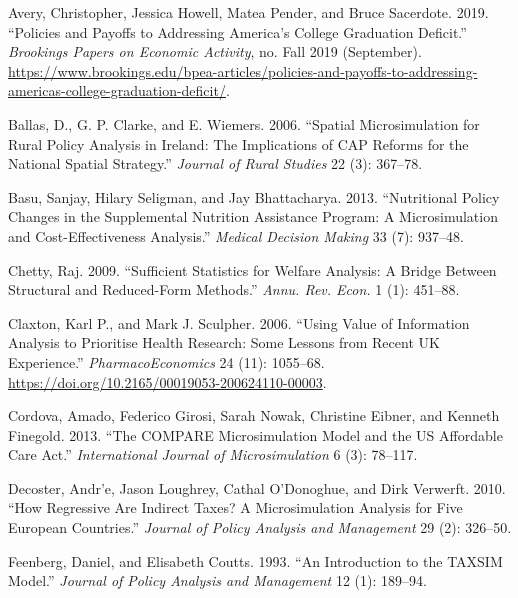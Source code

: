 \documentclass[
  10pt,
]{article}
\begin{document}
\leavevmode\hypertarget{ref-averyPoliciesPayoffsAddressing2019}{}%
Avery, Christopher, Jessica Howell, Matea Pender, and Bruce Sacerdote.
2019. ``Policies and Payoffs to Addressing America's College Graduation
Deficit.'' \emph{Brookings Papers on Economic Activity}, no. Fall 2019
(September).
\url{https://www.brookings.edu/bpea-articles/policies-and-payoffs-to-addressing-americas-college-graduation-deficit/}.

\leavevmode\hypertarget{ref-ballasSpatialMicrosimulationRural2006}{}%
Ballas, D., G. P. Clarke, and E. Wiemers. 2006. ``Spatial
Microsimulation for Rural Policy Analysis in Ireland: The Implications
of CAP Reforms for the National Spatial Strategy.'' \emph{Journal of
Rural Studies} 22 (3): 367--78.

\leavevmode\hypertarget{ref-basuNutritionalPolicyChanges2013}{}%
Basu, Sanjay, Hilary Seligman, and Jay Bhattacharya. 2013. ``Nutritional
Policy Changes in the Supplemental Nutrition Assistance Program: A
Microsimulation and Cost-Effectiveness Analysis.'' \emph{Medical
Decision Making} 33 (7): 937--48.

\leavevmode\hypertarget{ref-chetty_sufficient_2009}{}%
Chetty, Raj. 2009. ``Sufficient Statistics for Welfare Analysis: A
Bridge Between Structural and Reduced-Form Methods.'' \emph{Annu. Rev.
Econ.} 1 (1): 451--88.

\leavevmode\hypertarget{ref-claxton_using_2006}{}%
Claxton, Karl P., and Mark J. Sculpher. 2006. ``Using Value of
Information Analysis to Prioritise Health Research: Some Lessons from
Recent UK Experience.'' \emph{PharmacoEconomics} 24 (11): 1055--68.
\url{https://doi.org/10.2165/00019053-200624110-00003}.

\leavevmode\hypertarget{ref-cordovaCOMPAREMicrosimulationModel2013}{}%
Cordova, Amado, Federico Girosi, Sarah Nowak, Christine Eibner, and
Kenneth Finegold. 2013. ``The COMPARE Microsimulation Model and the US
Affordable Care Act.'' \emph{International Journal of Microsimulation} 6
(3): 78--117.

\leavevmode\hypertarget{ref-decosterHowRegressiveAre2010}{}%
Decoster, Andr\a'e, Jason Loughrey, Cathal O'Donoghue, and Dirk
Verwerft. 2010. ``How Regressive Are Indirect Taxes? A Microsimulation
Analysis for Five European Countries.'' \emph{Journal of Policy Analysis
and Management} 29 (2): 326--50.

\leavevmode\hypertarget{ref-feenbergIntroductionTAXSIMModel1993}{}%
Feenberg, Daniel, and Elisabeth Coutts. 1993. ``An Introduction to the
TAXSIM Model.'' \emph{Journal of Policy Analysis and Management} 12 (1):
189--94.
\end{document}
